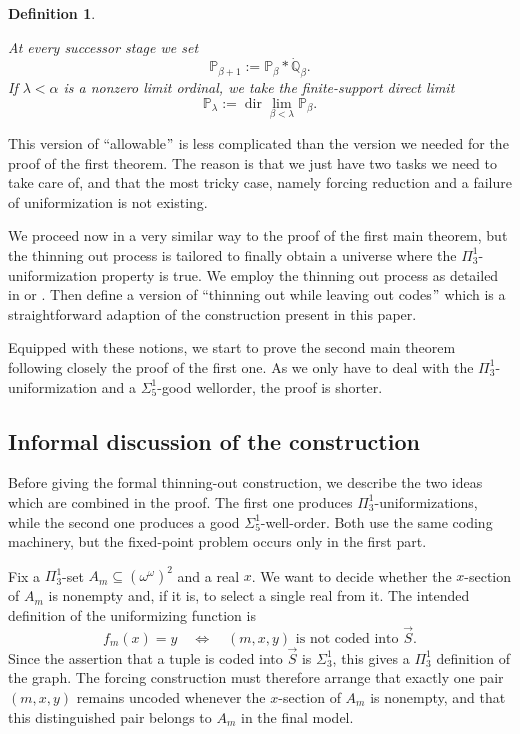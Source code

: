 \documentclass[a4paper,11pt]{article}
\newtheorem{definition}[theorem]{Definition}
\newcommand{\forceP}{\mathbb{P}}
\newcommand{\forceQ}{\mathbb{Q}}
\begin{document}
\begin{definition}
\begin{itemize}
     \end{itemize}

     At every successor stage we set
     \[
     \forceP_{\beta+1}:=\forceP_\beta*\dot{\forceQ}_\beta.
     \]
     If $\lambda<\alpha$ is a nonzero limit ordinal, we take the finite-support direct limit
     \[
     \forceP_\lambda:=\operatorname{dir}\lim_{\beta<\lambda}\forceP_\beta.
     \]
     
        \end{definition}

 This version of ``allowable$"$ is less complicated than the version we needed for the proof of the first theorem. The reason is that we just have two tasks we need to take care of, and that the most tricky case, namely forcing reduction and a failure of uniformization is not existing. 

We proceed now in a very similar way to the proof of the first main theorem, but the thinning out process is tailored to finally obtain a universe where the $\Pi^1_3$-uniformization property is true. We employ the thinning out process as detailed in  \cite{Uniformization} or \cite{Uniformization with wellorder}. Then define a version of ``thinning out while leaving out codes$"$ which is a straightforward adaption of the construction present in this paper.

Equipped with these notions, we start to prove the second main theorem following closely the proof of the first one. As we only have to deal with the $\Pi^1_3$-uniformization and a $\Sigma^1_5$-good wellorder, the proof is shorter.

\subsection{Informal discussion of the construction}\label{InformalSecondMainTheorem}

Before giving the formal thinning-out construction, we describe the two ideas which are combined in the proof.  The first one produces $\Pi^1_3$-uniformizations, while the second one produces a good $\Sigma^1_5$-well-order.  Both use the same coding machinery, but the fixed-point problem occurs only in the first part.

Fix a $\Pi^1_3$-set $A_m\subseteq(\omega^\omega)^2$ and a real $x$.  We want to decide whether the $x$-section of $A_m$ is nonempty and, if it is, to select a single real from it.  The intended definition of the uniformizing function is
\[
f_m(x)=y
\quad\Longleftrightarrow\quad
(m,x,y)\text{ is not coded into }\vec S.
\]
Since the assertion that a tuple is coded into $\vec S$ is $\Sigma^1_3$, this gives a $\Pi^1_3$ definition of the graph.  The forcing construction must therefore arrange that exactly one pair $(m,x,y)$ remains uncoded whenever the $x$-section of $A_m$ is nonempty, and that this distinguished pair belongs to $A_m$ in the final model.
\end{document}
